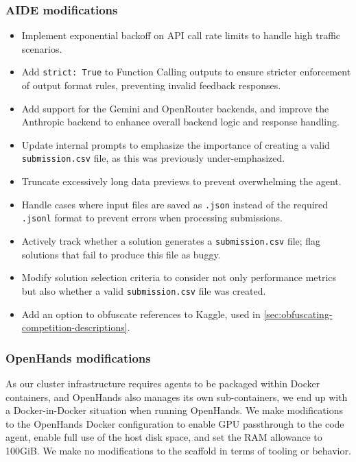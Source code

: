 \documentclass{article} %
\begin{document}
\subsubsection{AIDE modifications}

\begin{itemize}
    \item Implement exponential backoff on API call rate limits to handle high traffic scenarios.
    \item Add \texttt{strict: True} to Function Calling outputs to ensure stricter enforcement of output format rules, preventing invalid feedback responses.
    \item Add support for the Gemini and OpenRouter backends, and improve the Anthropic backend to enhance overall backend logic and response handling.
    \item Update internal prompts to emphasize the importance of creating a valid \texttt{submission.csv} file, as this was previously under-emphasized.
    \item Truncate excessively long data previews to prevent overwhelming the agent.
    \item Handle cases where input files are saved as \texttt{.json} instead of the required \texttt{.jsonl} format to prevent errors when processing submissions.
    \item Actively track whether a solution generates a \texttt{submission.csv} file; flag solutions that fail to produce this file as buggy.
    \item Modify solution selection criteria to consider not only performance metrics but also whether a valid \texttt{submission.csv} file was created.
    \item Add an option to obfuscate references to Kaggle, used in \autoref{sec:obfuscating-competition-descriptions}.
\end{itemize}

\subsubsection{OpenHands modifications}

As our cluster infrastructure requires agents to be packaged within Docker containers, and OpenHands also manages its own sub-containers, we end up with a Docker-in-Docker situation when running OpenHands. We make modifications to the OpenHands Docker configuration to enable GPU passthrough to the code agent, enable full use of the host disk space, and set the RAM allowance to 100GiB. We make no modifications to the scaffold in terms of tooling or behavior.
\end{document}
